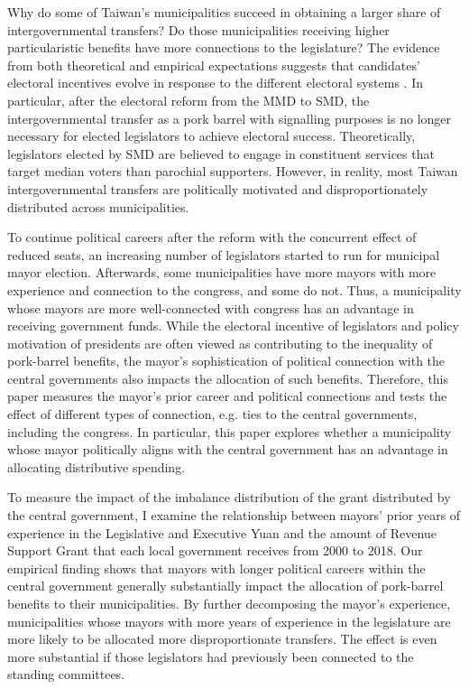 Why do some of Taiwan\textquoteright s municipalities succeed in obtaining a larger share of intergovernmental transfers? Do those municipalities receiving higher particularistic benefits have more connections to the legislature? The evidence from both theoretical and empirical expectations suggests that candidates' electoral incentives evolve in response to the different electoral systems \citep[][]{Myerson1993, Cox1990}. In particular, after the electoral reform from the MMD to SMD, the intergovernmental transfer as a pork barrel with signalling purposes is no longer necessary for elected legislators to achieve electoral success. Theoretically, legislators elected by SMD are believed to engage in constituent services that target median voters than parochial supporters. However, in reality, most Taiwan intergovernmental transfers are politically motivated and disproportionately distributed across municipalities. 

To continue political careers after the reform with the concurrent effect of reduced seats, an increasing number of legislators started to run for municipal mayor election. Afterwards, some municipalities have more mayors with more experience and connection to the congress, and some do not. Thus, a municipality whose mayors are more well-connected with congress has an advantage in receiving government funds. While the electoral incentive of legislators and policy motivation of presidents are often viewed as contributing to the inequality of pork-barrel benefits, the mayor's sophistication of political connection with the central governments also impacts the allocation of such benefits. Therefore, this paper measures the mayor's prior career and political connections and tests the effect of different types of connection, e.g. ties to the central governments, including the congress. In particular, this paper explores whether a municipality whose mayor politically aligns with the central government has an advantage in allocating distributive spending. 

To measure the impact of the imbalance distribution of the grant distributed by the central government, I examine the relationship between mayors' prior years of experience in the Legislative and Executive Yuan and the amount of Revenue Support Grant that each local government receives from 2000 to 2018. Our empirical finding shows that mayors with longer political careers within the central government generally substantially impact the allocation of pork-barrel benefits to their municipalities. By further decomposing the mayor's experience, municipalities whose mayors with more years of experience in the legislature are more likely to be allocated more disproportionate transfers. The effect is even more substantial if those legislators had previously been connected to the standing committees. 

